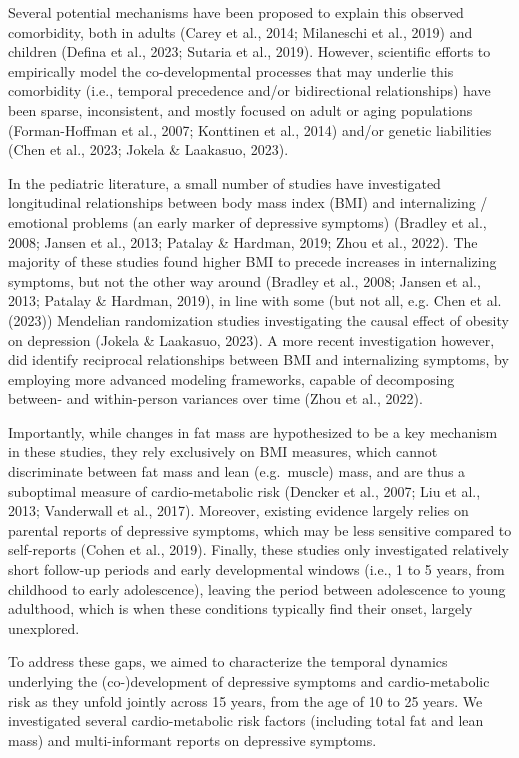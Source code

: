 \documentclass[
  letterpaper,
  DIV=11,
  numbers=noendperiod]{scrreport}
\begin{document}
Several potential mechanisms have been proposed to explain this observed
comorbidity, both in adults (Carey et al., 2014; Milaneschi et al.,
2019) and children (Defina et al., 2023; Sutaria et al., 2019). However,
scientific efforts to empirically model the co-developmental processes
that may underlie this comorbidity (i.e., temporal precedence and/or
bidirectional relationships) have been sparse, inconsistent, and mostly
focused on adult or aging populations (Forman-Hoffman et al., 2007;
Konttinen et al., 2014) and/or genetic liabilities (Chen et al., 2023;
Jokela \& Laakasuo, 2023).

In the pediatric literature, a small number of studies have investigated
longitudinal relationships between body mass index (BMI) and
internalizing / emotional problems (an early marker of depressive
symptoms) (Bradley et al., 2008; Jansen et al., 2013; Patalay \&
Hardman, 2019; Zhou et al., 2022). The majority of these studies found
higher BMI to precede increases in internalizing symptoms, but not the
other way around (Bradley et al., 2008; Jansen et al., 2013; Patalay \&
Hardman, 2019), in line with some (but not all, e.g. Chen et al. (2023))
Mendelian randomization studies investigating the causal effect of
obesity on depression (Jokela \& Laakasuo, 2023). A more recent
investigation however, did identify reciprocal relationships between BMI
and internalizing symptoms, by employing more advanced modeling
frameworks, capable of decomposing between- and within-person variances
over time (Zhou et al., 2022).

Importantly, while changes in fat mass are hypothesized to be a key
mechanism in these studies, they rely exclusively on BMI measures, which
cannot discriminate between fat mass and lean (e.g.~muscle) mass, and
are thus a suboptimal measure of cardio-metabolic risk (Dencker et al.,
2007; Liu et al., 2013; Vanderwall et al., 2017). Moreover, existing
evidence largely relies on parental reports of depressive symptoms,
which may be less sensitive compared to self-reports (Cohen et al.,
2019). Finally, these studies only investigated relatively short
follow-up periods and early developmental windows (i.e., 1 to 5 years,
from childhood to early adolescence), leaving the period between
adolescence to young adulthood, which is when these conditions typically
find their onset, largely unexplored.

To address these gaps, we aimed to characterize the temporal dynamics
underlying the (co-)development of depressive symptoms and
cardio-metabolic risk as they unfold jointly across 15 years, from the
age of 10 to 25 years. We investigated several cardio-metabolic risk
factors (including total fat and lean mass) and multi-informant reports
on depressive symptoms.
\end{document}
